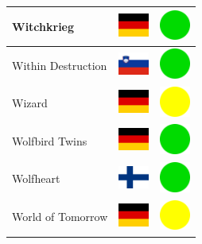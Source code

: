 \documentclass[12pt, a4paper, twoside]{report}
\begin{document}
\begin{center}
\begin{longtable}{|p{5cm}|p{2cm}|p{2cm}|}
 Witchkrieg                                                 & \includegraphics[width=1cm]{../img/flags/de} &   \includegraphics[width=1cm]{../likes/y} \\ \hline
 Within Destruction                                         & \includegraphics[width=1cm]{../img/flags/si} &   \includegraphics[width=1cm]{../likes/y} \\ \hline
 Wizard                                                     & \includegraphics[width=1cm]{../img/flags/de} &   \includegraphics[width=1cm]{../likes/m} \\ \hline
 Wolfbird Twins                                             & \includegraphics[width=1cm]{../img/flags/de} &   \includegraphics[width=1cm]{../likes/y} \\ \hline
 Wolfheart                                                  & \includegraphics[width=1cm]{../img/flags/fi} &   \includegraphics[width=1cm]{../likes/y} \\ \hline
 World of Tomorrow                                          & \includegraphics[width=1cm]{../img/flags/de} &   \includegraphics[width=1cm]{../likes/m} \\ \hline

\end{longtable}
\end{center}
\end{document}
